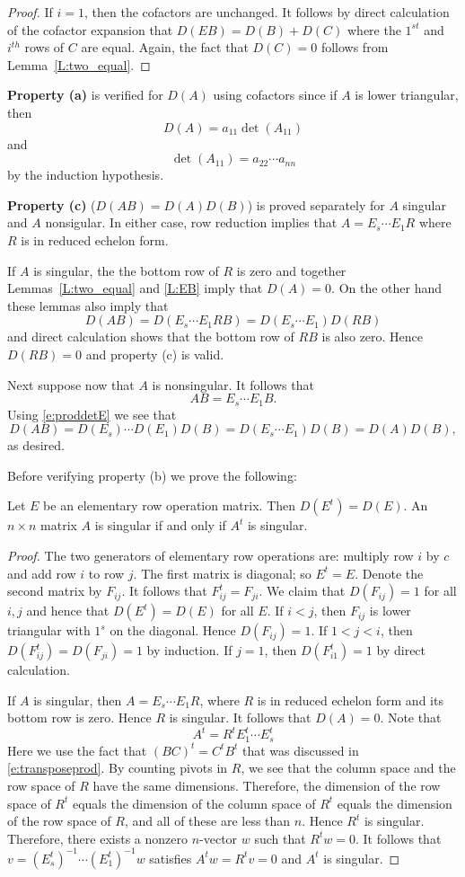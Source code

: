 \documentclass{ximera}
\begin{document}
\begin{proof}
If $i=1$, then the cofactors are unchanged.  It follows by direct calculation of the 
cofactor expansion that $D(EB) = D(B) + D(C)$ where the $1^{st}$ and $i^{th}$ 
rows of $C$ are equal.  Again, the fact that $D(C)=0$ follows from 
Lemma~\ref{L:two_equal}.
\end{proof}

{\bf Property (a)} is verified for $D(A)$ using cofactors since if $A$ is lower
triangular, then
\[
D(A) = a_{11}\det(A_{11}) 
\]
and 
\[
\det(A_{11}) = a_{22}\cdots a_{nn}
\]
by the induction hypothesis.

{\bf Property (c)} ($D(AB)=D(A)D(B)$) is proved separately 
for $A$ singular and $A$ nonsigular.  In either case, row 
reduction implies that $A = E_s\cdots E_1 R$ where $R$ is 
in reduced echelon form. 

If $A$ is singular, the the bottom row of $R$ is zero and together 
Lemmas~\ref{L:two_equal} and \ref{L:EB} imply that $D(A)=0$.
On the other hand these lemmas also imply that 
\[
D(AB) = D(E_s\cdots E_1 RB)  = D(E_s\cdots E_1) D(RB) 
\]
and direct calculation shows that the bottom row of $RB$ is 
also zero.  Hence $D(RB)=0$ and property (c) is valid.

Next suppose now that $A$ is nonsingular.  It follows that 
\[
AB = E_s\cdots E_1B.
\]
Using \eqref{e:proddetE} we see that
\[
D(AB)=D(E_s)\cdots D(E_1)D(B) = D(E_s\cdots E_1)D(B) = D(A)D(B),
\]
as desired.  

Before verifying property (b) we prove the following:
\begin{lemma}
Let $E$ be an elementary row operation matrix.  Then $D(E^t) = D(E)$.   
An $n\times n$ matrix $A$ is singular if and only if $A^t$ is singular.
\end{lemma}

\begin{proof}
The two generators of elementary row operations are: multiply row $i$ 
by $c$ and add row $i$ to row $j$. The first matrix is diagonal; so 
$E^t = E$.  Denote the second matrix by $F_{ij}$.  It follows that 
$F_{ij}^t = F_{ji}$.   We claim that $D(F_{ij})=1$ for all $i,j$ and hence 
that $D(E^t) = D(E)$ for all $E$. If $i<j$, then $F_{ij}$ is lower triangular 
with $1^s$ on the diagonal.  Hence $D(F_{ij})=1$.  If $1<j<i$, then 
$D(F_{ij}^t) = D(F_{ji}) = 1$ by induction.  If $j=1$, then $D(F_{i1}^t) = 1$ 
by direct calculation. 

If $A$ is singular, then $A=E_s\cdots E_1R$, where $R$ is in reduced 
echelon form and its bottom row is zero. Hence $R$ is singular. It follows 
that $D(A) = 0$. Note that 
\[
A^t = R^t E_1^t\cdots E_s^t
\] 
Here we use the fact that $(BC)^t= C^tB^t$ that was discussed in \eqref{e:transposeprod}.  
By counting pivots in $R$, we see that the column space and the row space 
of $R$ have the same dimensions.  Therefore, the dimension of the row 
space of $R^t$ equals the dimension of the column space of $R^t$ equals 
the dimension of the row space of $R$, and all of these are less than $n$. 
Hence $R^t$ is singular.  Therefore, there exists a nonzero $n$-vector $w$ such that 
$R^tw=0$.  It follows that $v = (E_s^t)^{-1}\cdots (E_1^t)^{-1} w$ satisfies 
$A^tw = R^tv = 0$ and $A^t$ is singular.
\end{proof}
\end{document}
